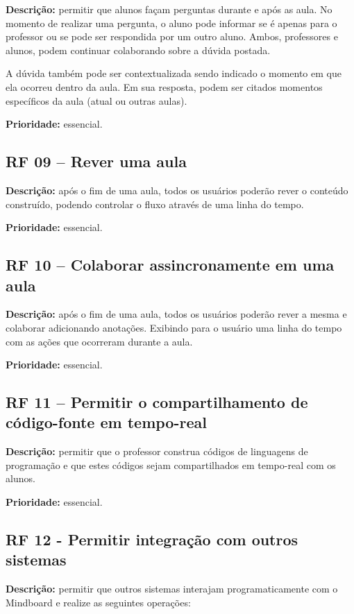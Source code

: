 \textbf{Descrição:} permitir que alunos façam perguntas durante e após as aula. No momento de realizar uma pergunta, o aluno pode informar se é apenas para o professor ou se pode ser respondida por um outro aluno. Ambos, professores e alunos, podem continuar colaborando sobre a dúvida postada.

A dúvida também pode ser contextualizada sendo indicado o momento em que ela ocorreu dentro da aula. Em sua resposta, podem ser citados momentos específicos da aula (atual ou outras aulas).

\textbf{Prioridade:} essencial.


\subsection{RF 09 – Rever uma aula}

\textbf{Descrição:} após o fim de uma aula, todos os usuários poderão rever o conteúdo construído, podendo controlar o fluxo através de uma linha do tempo.

\textbf{Prioridade:} essencial.

\subsection{RF 10 – Colaborar assincronamente em uma aula}

\textbf{Descrição:} após o fim de uma aula, todos os usuários poderão rever a mesma e colaborar adicionando anotações. Exibindo para o usuário uma linha do tempo com as ações que ocorreram durante a aula.

\textbf{Prioridade:} essencial.

\subsection{RF 11 – Permitir o compartilhamento de código-fonte em tempo-real}

\textbf{Descrição:} permitir que o professor construa códigos de linguagens de programação e que estes códigos sejam compartilhados em tempo-real com os alunos.

\textbf{Prioridade:} essencial.

\subsection{RF 12 - Permitir integração com outros sistemas}

\textbf{Descrição:} permitir que outros sistemas interajam programaticamente com o Mindboard e realize as seguintes operações:

